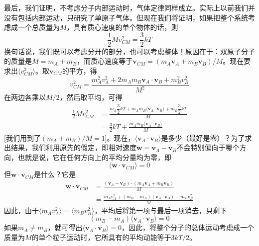 最后，我们证明，不考虑分子内部运动时，气体定律同样成立。实际上以前我们并没有包括内部运动，只研究了单原子气体。但现在我们将证明，如果把整个系统考虑成一个总质量为$M$，具有质心速度的单个物体的话，则
\begin{equation}
    \label{Eq:I:39:24}
    \frac{1}{2}Mv_{CM}^2 = \frac{3}{2}kT
\end{equation}
换句话说，我们既可以考虑分开的部分，也可以考虑整体！原因在于：双原子分子的质量是$M=m_A+m_B$，而质心速度等于$\boldsymbol{v}_{CM}=(m_A\boldsymbol{v}_A+m_B\boldsymbol{v}_B)/M$。现在要求出$\langle v^2_{CM} \rangle$。取$\boldsymbol{v}_{CM}$的平方，得
\begin{equation*}
    v_{CM}^2 = \frac{m_A^2v_A^2 + 2m_Am_B\boldsymbol{v}_A\cdot\boldsymbol{v}_B + m_B^2v_B^2}{M^2}
\end{equation*}
在两边各乘以$M/2$，然后取平均，可得
\begin{equation*}
    \begin{aligned}
        \frac{1}{2}Mv_{CM}^2 &= \frac{m_A\dfrac{3}{2}kT + m_Am_B\langle \boldsymbol{v}_A\cdot\boldsymbol{v}_B \rangle + m_B\dfrac{3}{2}kT}{M} \\
        &= \frac{3}{2}kT + \frac{m_Am_B\langle \boldsymbol{v}_A\cdot\boldsymbol{v}_B \rangle}{M}
    \end{aligned}
\end{equation*}
[我们用到了$(m_A+m_B)/M=1$]。现在，$\langle \boldsymbol{v}_A\cdot\boldsymbol{v}_B \rangle$是多少（最好是零）？为了求出结果，我们利用原先的假定，即相对速度$\boldsymbol{w}=\boldsymbol{v}_A-\boldsymbol{v}_B$不会特别偏向于哪个方向，也就是说，它在任何方向上的平均分量均为零，即
\begin{equation*}
    \langle \boldsymbol{w}\cdot\boldsymbol{v}_{CM} \rangle = 0
\end{equation*}
但$\boldsymbol{w}\cdot\boldsymbol{v}_{CM}$是什么？它是
\begin{equation*}
    \begin{aligned}
        \boldsymbol{w}\cdot\boldsymbol{v}_{CM} &= \frac{(\boldsymbol{v}_A - \boldsymbol{v}_B) \cdot (m_A\boldsymbol{v}_A + m_B\boldsymbol{v}_B)}{M} \\
        &= \frac{m_Av_A^2 + (m_B-m_A)(\boldsymbol{v}_A\cdot\boldsymbol{v}_B) - m_Bv_B^2}{M}
    \end{aligned}
\end{equation*}
因此，由于$\langle m_Av_A^2 \rangle = \langle m_Bv_B^2 \rangle$，平均后将第一项与最后一项消去，只剩下
\begin{equation*}
    (m_B - m_A) \langle \boldsymbol{v}_A\cdot\boldsymbol{v}_B \rangle = 0
\end{equation*}
如果$m_A \neq m_B$，就可得出$ \langle \boldsymbol{v}_A\cdot\boldsymbol{v}_B \rangle = 0$，因此，将整个分子的总体运动考虑成一个质量为$M$的单个粒子运动时，它所具有的平均动能等于$3kT/2$。

